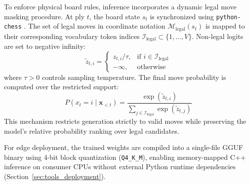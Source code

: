 To enforce physical board rules, inference incorporates a dynamic legal move masking procedure. At ply $t$, the board state $s_t$ is synchronized using \texttt{python-chess} \parencite{romstad2024pythonchess}. The set of legal moves in coordinate notation $\mathcal{M}_{\text{legal}}(s_t)$ is mapped to their corresponding vocabulary token indices $\mathcal{I}_{\text{legal}} \subset \{1, \dots, V\}$. Non-legal logits are set to negative infinity:
\begin{equation}
    \tilde{z}_{t, i} = 
    \begin{cases}
        z_{t, i} / \tau, & \text{if } i \in \mathcal{I}_{\text{legal}} \\
        -\infty, & \text{otherwise}
    \end{cases}
\end{equation}
where $\tau > 0$ controls sampling temperature. The final move probability is computed over the restricted support:
\begin{equation}
    P(x_t = i \mid \mathbf{x}_{<t}) = \frac{\exp(\tilde{z}_{t, i})}{\sum_{j \in \mathcal{I}_{\text{legal}}} \exp(\tilde{z}_{t, j})}
\end{equation}
This mechanism restricts generation strictly to valid moves while preserving the model's relative probability ranking over legal candidates.

For edge deployment, the trained weights are compiled into a single-file GGUF binary using 4-bit block quantization (\texttt{Q4\_K\_M}), enabling memory-mapped C++ inference on consumer CPUs without external Python runtime dependencies (Section~\ref{sec:tools_deployment}).


